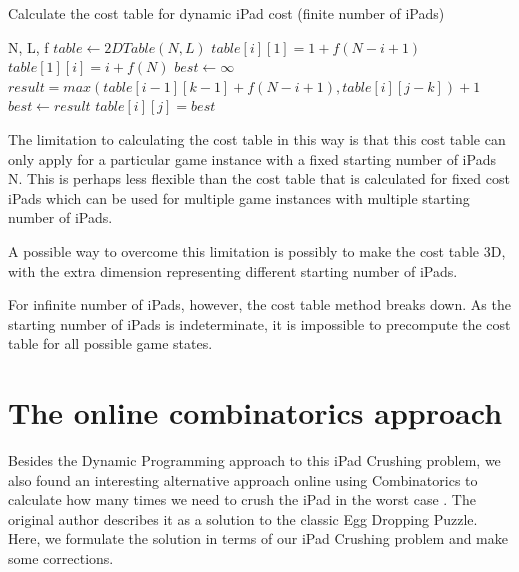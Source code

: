 \documentclass[12pt,a4paper,oneside]{report}
\begin{document}
\begin{algorithm}[H]
\caption{Calculate the cost table for dynamic iPad cost (finite number of iPads)}
\begin{algorithmic}[1]
\REQUIRE N, L, f
\STATE $table \leftarrow 2DTable(N, L)$
	\STATE $table[i][1] = 1 + f(N-i+1)$
\ENDFOR
{}
	\STATE $table[1][i] = i + f(N)$
\ENDFOR
{}
		\STATE $best \leftarrow \infty$
			\STATE $result = max(table[i - 1][k - 1] + f(N-i+1), table[i][j - k]) + 1$
				\STATE $best \leftarrow result$
			\ENDIF
		\ENDFOR
		\STATE $table[i][j] = best$
	\ENDFOR
\ENDFOR
\end{algorithmic}
\end{algorithm}

The limitation to calculating the cost table in this way is that this cost table can only apply for a particular game instance with a fixed starting number of iPads N. This is perhaps less flexible than the cost table that is calculated for fixed cost iPads which can be used for multiple game instances with multiple starting number of iPads.

A possible way to overcome this limitation is possibly to make the cost table 3D, with the extra dimension representing different starting number of iPads.

For infinite number of iPads, however, the cost table method breaks down. As the starting number of iPads is indeterminate, it is impossible to precompute the cost table for all possible game states.





\chapter{The online combinatorics approach}
Besides the Dynamic Programming approach to this iPad Crushing problem, we also found an interesting alternative approach online using Combinatorics to calculate how many times we need to crush the iPad in the worst case \cite{randomblogpost}. The original author describes it as a solution to the classic Egg Dropping Puzzle. Here, we formulate the solution in terms of our iPad Crushing problem and make some corrections.
\end{document}
